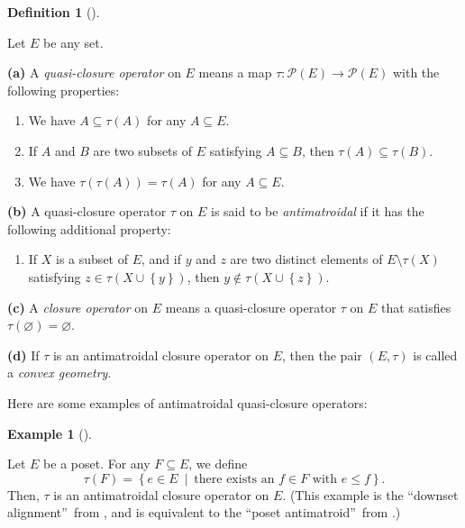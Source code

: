\documentclass[numbers=enddot,12pt,final,onecolumn]{scrartcl}%
\theoremstyle{definition}
\newtheorem{defi}[theo]{Definition}
\newenvironment{definition}[1][]
{\begin{defi}[#1]\begin{leftbar}}
{\end{leftbar}\end{defi}}
\newtheorem{exam}[theo]{Example}
\newenvironment{example}[1][]
{\begin{exam}[#1]\begin{leftbar}}
{\end{leftbar}\end{exam}}
\renewcommand{\leq}{\leqslant}
\begin{document}
\begin{definition}
\label{def.antimat}Let $E$ be any set.

\textbf{(a)} A \emph{quasi-closure operator} on $E$ means a map $\tau
:\mathcal{P}\left(  E\right)  \rightarrow\mathcal{P}\left(  E\right)  $ with
the following properties:

\begin{enumerate}
\item We have $A\subseteq\tau\left(  A\right)  $ for any $A\subseteq E$.

\item If $A$ and $B$ are two subsets of $E$ satisfying $A\subseteq B$, then
$\tau\left(  A\right)  \subseteq\tau\left(  B\right)  $.

\item We have $\tau\left(  \tau\left(  A\right)  \right)  =\tau\left(
A\right)  $ for any $A\subseteq E$.
\end{enumerate}

\textbf{(b)} A quasi-closure operator $\tau$ on $E$ is said to be
\emph{antimatroidal} if it has the following additional property:

\begin{enumerate}
\item[4.] If $X$ is a subset of $E$, and if $y$ and $z$ are two distinct
elements of $E\setminus\tau\left(  X\right)  $ satisfying $z\in\tau\left(
X\cup\left\{  y\right\}  \right)  $, then $y\notin\tau\left(  X\cup\left\{
z\right\}  \right)  $.
\end{enumerate}

\textbf{(c)} A \emph{closure operator} on $E$ means a quasi-closure operator
$\tau$ on $E$ that satisfies $\tau\left(  \varnothing\right)  =\varnothing$.

\textbf{(d)} If $\tau$ is an antimatroidal closure operator on $E$, then the
pair $\left(  E,\tau\right)  $ is called a \emph{convex geometry}.
\end{definition}

Here are some examples of antimatroidal quasi-closure operators:

\begin{example}
\label{exa.antimat.low}Let $E$ be a poset. For any $F\subseteq E$, we define%
\[
\tau\left(  F\right)  =\left\{  e\in E\ \mid\ \text{there exists an }f\in
F\text{ with }e\leq f\right\}  .
\]
Then, $\tau$ is an antimatroidal closure operator on $E$. (This example is the
\textquotedblleft downset alignment\textquotedblright\ from \cite[\S 3,
Example II]{EdeJam85}, and is equivalent to the \textquotedblleft poset
antimatroid\textquotedblright\ from \cite[\S III.2.3]{KoLoSc91}.)
\end{example}
\end{document}

